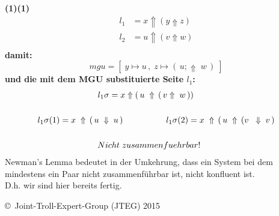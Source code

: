 \documentclass{article}
\begin{document}
		\textbf{(1)(1)}
			\begin{align*}
				l_1 &= x \Uparrow ( y \Uparrow z)  \\
				l_2 &= u \Uparrow ( v \Uparrow w)  \\
			\end{align*}
		\textbf{damit:}
			\[
				mgu = [\;y \mapsto u\,,\;z \mapsto (\,u;\Uparrow\;w\,)\;]
			\]
		\textbf{und die mit dem MGU substituierte Seite $l_1$:}
			\begin{align*}
				l_1\sigma = x \Uparrow (\,u\;&\Uparrow\,(\,v\Uparrow\;w\,))\\ \\
				l_1\sigma (1) = x\;\Uparrow \, ( \, u \; \Downarrow \; u\,)
				\hspace{1cm}&\hspace{8mm}
				l_1\sigma (2) = x\;\Uparrow \, ( \, u \; \Uparrow \,(v\;\;\Downarrow\;v\,) \\\\
				Nicht\;zusam&menfuehrbar!\\
			\end{align*}
		Newman's Lemma bedeutet in der Umkehrung, dass ein System bei dem mindestens ein Paar nicht zusammenf\"uhrbar ist, nicht konfluent ist.\\
		D.h. wir sind hier bereits fertig.
		
		
		
		
		
		
		
		
		
	
		
		
		
	\begin{tiny}
	\copyright\ Joint-Troll-Expert-Group (JTEG) 2015
	\end{tiny}
\end{document}
